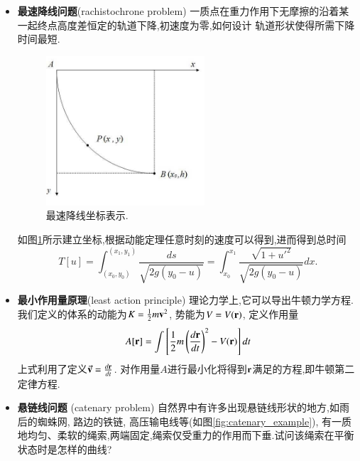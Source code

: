 \begin{itemize}
  \item \textbf{最速降线问题}(rachistochrone problem) 一质点在重力作用下无摩擦的沿着某一起终点高度差恒定的轨道下降,初速度为零,如何设计
  轨道形状使得所需下降时间最短.
  \begin{figure}
    \centering
    \includegraphics[width=0.5\linewidth,height=15em]{fastest_track.png}
    \caption{最速降线坐标表示.}
    \label{fig:rachistochrone}
  \end{figure}
  如图\ref{fig:rachistochrone}所示建立坐标,根据动能定理任意时刻的速度可以得到,进而得到总时间
  \begin{equation}
    T[u] = \int_{(x_0,y_0)}^{(x_1, y_1)} \frac{ds}{\sqrt{2 g(y_0 - u)}} = \int_{x_0}^{x_1} \frac{\sqrt{1+u'^2}}{\sqrt{2 g (y_0 - u)}} dx.
  \end{equation}

  \item \textbf{最小作用量原理}(least action principle) 理论力学上,它可以导出牛顿力学方程.我们定义的体系的动能为$K = {\frac{1}{2}} m {\mathbf{v}}^2$,
  势能为$V = V({\mathbf{r}})$, 定义作用量
  \begin{equation}
    A[{\mathbf{r}}] = \int \left[ {\frac{1}{2}} m \left( \frac{d{\mathbf{r}}}{dt} \right)^2 - V({\mathbf{r}}) \right] dt 
  \end{equation}
  上式利用了定义$\vec{{\mathbf{v}}} = \frac{d{\mathbf{r}}}{dt}$. 对作用量$A$进行最小化将得到${\mathbf{r}}$满足的方程,即牛顿第二定律方程.

  \item \textbf{悬链线问题} (catenary problem) \quad 自然界中有许多出现悬链线形状的地方,如雨后的蜘蛛网, 路边的铁链, 高压输电线等(如图\ref{fig:catenary_example}), 有一质地均匀、柔软的绳索,两端固定,绳索仅受重力的作用而下垂.试问该绳索在平衡状态时是怎样的曲线?
  \begin{figure}
    \centering


\end{figure}
\end{itemize}
